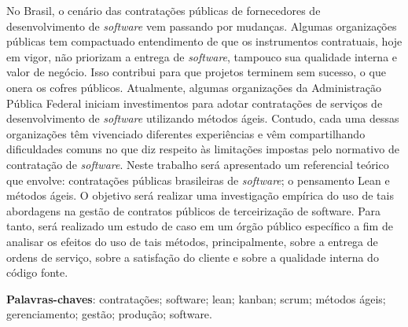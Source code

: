 \begin{resumo}
No Brasil, o cenário das contratações públicas de fornecedores de desenvolvimento de \textit{software} vem passando por mudanças. Algumas organizações públicas tem compactuado entendimento de que os instrumentos contratuais, hoje em vigor, não priorizam a entrega de \textit{software}, tampouco sua qualidade interna e valor de negócio. Isso contribui para que projetos terminem sem sucesso, o que onera os cofres públicos. Atualmente, algumas organizações da Administração Pública Federal iniciam investimentos para adotar contratações de serviços de desenvolvimento de \textit{software} utilizando métodos ágeis. Contudo, cada uma dessas organizações têm vivenciado diferentes experiências e vêm compartilhando dificuldades comuns no que diz respeito às limitações impostas pelo normativo de contratação de \textit{software}. Neste trabalho será apresentado um referencial teórico que envolve: contratações públicas brasileiras de \textit{software}; o pensamento Lean e métodos ágeis. O objetivo será realizar uma investigação empírica do uso de tais abordagens na gestão de contratos públicos de terceirização de software. Para tanto, será realizado um estudo de caso em um órgão público específico a fim de analisar os efeitos do uso de tais métodos, principalmente, sobre a entrega de ordens de serviço, sobre a satisfação do cliente e sobre a qualidade interna do código fonte.

\vspace{\onelineskip}
    
 \noindent
 \textbf{Palavras-chaves}: contratações; software; lean; kanban; scrum; métodos ágeis; gerenciamento; gestão; produção; software.
\end{resumo}
